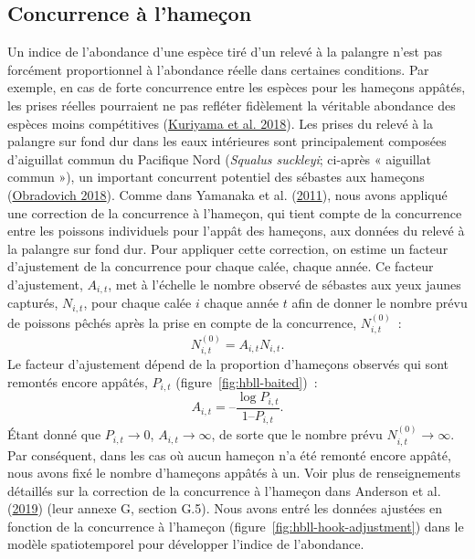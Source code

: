 \documentclass[french,11pt]{book}
\begin{document}
\hypertarget{sec:hbll-hook-competition}{%
\subsection{Concurrence à l'hameçon}\label{sec:hbll-hook-competition}}

Un indice de l'abondance d'une espèce tiré d'un relevé à la palangre n'est pas forcément proportionnel à l'abondance réelle dans certaines conditions. Par exemple, en cas de forte concurrence entre les espèces pour les hameçons appâtés, les prises réelles pourraient ne pas refléter fidèlement la véritable abondance des espèces moins compétitives (\protect\hyperlink{ref-kuriyama2018}{Kuriyama et al. 2018}). Les prises du relevé à la palangre sur fond dur dans les eaux intérieures sont principalement composées d'aiguillat commun du Pacifique Nord (\emph{Squalus suckleyi}; ci-après « aiguillat commun »), un important concurrent potentiel des sébastes aux hameçons (\protect\hyperlink{ref-obradovich2018}{Obradovich 2018}). Comme dans Yamanaka et al. (\protect\hyperlink{ref-yamanaka2011}{2011}), nous avons appliqué une correction de la concurrence à l'hameçon, qui tient compte de la concurrence entre les poissons individuels pour l'appât des hameçons, aux données du relevé à la palangre sur fond dur. Pour appliquer cette correction, on estime un facteur d'ajustement de la concurrence pour chaque calée, chaque année. Ce facteur d'ajustement, \(A_{i,t}\), met à l'échelle le nombre observé de sébastes aux yeux jaunes capturés, \(N_{i,t}\), pour chaque calée \(i\) chaque année \(t\) afin de donner le nombre prévu de poissons pêchés après la prise en compte de la concurrence, \(N_{i,t}^{(0)}\)~:
\begin{equation}
N_{i,t}^{(0)} = A_{i,t} N_{i,t}.
\label{eq:Nit}
\end{equation}
Le facteur d'ajustement dépend de la proportion d'hameçons observés qui sont remontés encore appâtés, \(P_{i,t}\) (figure~\ref{fig:hbll-baited})~:
\begin{equation}
A_{i,t} = – \frac{ \log P_{i,t}}{1 – P_{i,t}}.
\label{eq:hbll-hook-adjustment}
\end{equation}
Étant donné que \(P_{i,t} \rightarrow 0\), \(A_{i,t} \rightarrow \infty\), de sorte que le nombre prévu \(N_{i,t}^{(0)} \rightarrow \infty\). Par conséquent, dans les cas où aucun hameçon n'a été remonté encore appâté, nous avons fixé le nombre d'hameçons appâtés à un. Voir plus de renseignements détaillés sur la correction de la concurrence à l'hameçon dans Anderson et al. (\protect\hyperlink{ref-anderson2019synopsis}{2019}) (leur annexe G, section G.5). Nous avons entré les données ajustées en fonction de la concurrence à l'hameçon (figure~\ref{fig:hbll-hook-adjustment}) dans le modèle spatiotemporel pour développer l'indice de l'abondance.
\end{document}
